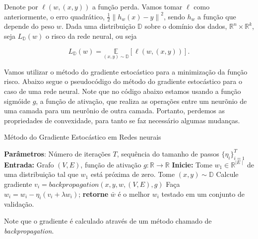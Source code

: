 \documentclass[
	12pt,				%
    oneside,			%
	a4paper,			%
	english,			%
	french,				%
	spanish,			%
	brazil,				%
	]{abntex2}
\newcommand{\norm}[1]{\left\lVert#1\right\rVert}
\begin{document}
        Denote por $\ell(w,(x,y))$ a função perda. Vamos tomar $\ell$ como anteriormente, o erro quadrático, $\frac{1}{2} \norm{h_w(x) - y}^2$, sendo $h_w$ a função que depende do peso $w$. Dada uma distribuição $\mathbb{D}$ sobre o domínio dos dados, $\mathbb{R}^n \times \mathbb{R}^k$, seja $L_{\mathbb{D}}(w)$ o risco da rede neural, ou seja

        \begin{equation*}
            L_{\mathbb{D}}(w) = \underset{(x,y) \sim \mathbb{D}}{\mathbb{E}}\left[\ell(w, (x,y))\right].
        \end{equation*}

        Vamos utilizar o método do gradiente estocástico para a minimização da função risco. Abaixo segue o pseudocódigo do método do gradiente estocástico para o caso de uma rede neural. Note que no código abaixo estamos usando a função sigmóide $g$, a função de ativação, que realiza as operações entre um neurõnio de uma camada para um neurônio de outra camada. Portanto, perdemos as propriedades de convexidade, para tanto se faz necessário algumas mudanças.

        \begin{algorithm}[thb]
            \caption{Método do Gradiente Estocástico em Redes neurais}
            \begin{algorithmic}[1]
                \State \textbf{Parâmetros}: Número de iterações $T$, sequência do tamanho de passos $\{\eta_i\}_{i=1}^{T}$
                \State \textbf{Entrada:} Grafo $(V,E)$, função de ativação $g:\mathbb{R} \to \mathbb{R}$
                \State \textbf{Inicie:} Tome $w_1 \in \mathbb{R}^{\mid E \mid}$ de uma distribuição tal que $w_1$ está próxima de zero.
                    \State Tome $(x,y) \sim \mathbb{D}$
                    \State Calcule gradiente $v_i = backpropagation(x,y,w,(V,E),g)$
                    \State Faça $w_{i} = w_i - \eta_i (v_i + \lambda w_i)$;
                \EndFor
                \State \textbf{retorne} $\bar{w}$ é o melhor $w_i$ testado em um conjunto de validação.
            \end{algorithmic}
        \end{algorithm}

        Note que o gradiente é calculado através de um método chamado de \emph{backpropagation}.
\end{document}
